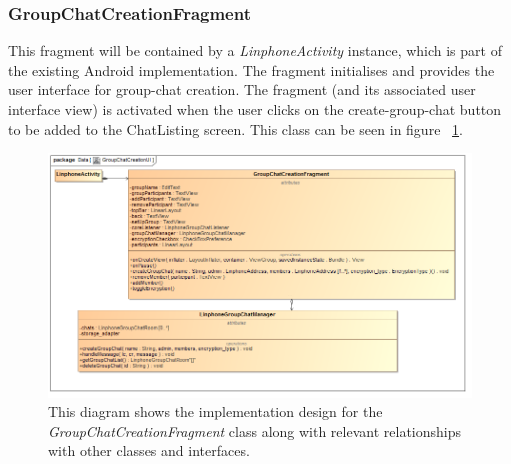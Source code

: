 \documentclass[11pt]{article}
\begin{document}
\subsubsection{GroupChatCreationFragment}
This fragment will be contained by a \textit{LinphoneActivity} instance, which is part of the existing Android implementation. The fragment initialises and provides the user interface for group-chat creation. The fragment (and its associated user interface view) is activated when the user clicks on the create-group-chat button to be added to the ChatListing screen. This class can be seen in figure ~\ref{cd-group-chat-creation-ui}.
\begin{figure}[H]
\centering
\includegraphics[width=5in]{./images/class_groupchat_creation_ui.png}
\caption[Android Group Chat Creation UI Class Diagram]{This diagram shows the implementation design for the \textit{GroupChatCreationFragment} class along with relevant relationships with other classes and interfaces.}
\label{cd-group-chat-creation-ui}
\end{figure}
\end{document}
